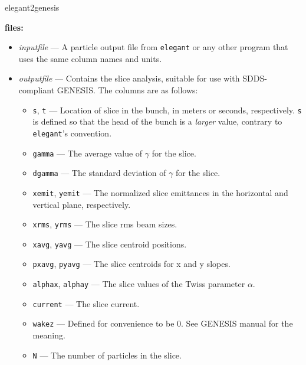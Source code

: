 \begin{sddsprog}{elegant2genesis}
  \item \textbf{files:}
  \begin{itemize}
    \item {\em inputfile} --- A particle output file from \verb|elegant| or any other program that uses the same column names and units.
    \item {\em outputfile} --- Contains the slice analysis, suitable for use with SDDS-compliant GENESIS.  The columns are as follows:
      \begin{itemize}
        \item \verb|s|, \verb|t| --- Location of slice in the bunch, in meters or seconds, respectively. \verb|s| is defined so that the head of the bunch is a {\em larger} value, contrary to {\tt elegant}'s convention.
        \item \verb|gamma| --- The average value of $\gamma$ for the slice.
        \item \verb|dgamma| --- The standard deviation of $\gamma$ for the slice.
        \item \verb|xemit|, \verb|yemit| --- The normalized slice emittances in the horizontal and vertical plane, respectively.
        \item \verb|xrms|, \verb|yrms| --- The slice rms beam sizes.
        \item \verb|xavg|, \verb|yavg| --- The slice centroid positions.
        \item \verb|pxavg|, \verb|pyavg| --- The slice centroids for x and y slopes.
        \item \verb|alphax|, \verb|alphay| --- The slice values of the Twiss parameter $\alpha$.
        \item \verb|current| --- The slice current.
        \item \verb|wakez| --- Defined for convenience to be 0.  See GENESIS manual for the meaning.
        \item \verb|N| --- The number of particles in the slice.
      \end{itemize}
  \end{itemize}


\end{sddsprog}

